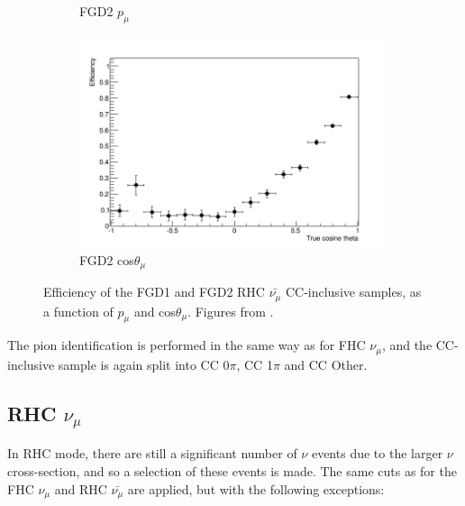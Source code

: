 \begin{figure}
\begin{subfigure}{.49\textwidth}
  \caption{FGD2 $p_{\mu}$}
\end{subfigure}
\begin{subfigure}{.49\textwidth}
  \centering
  \includegraphics[width=1.0\linewidth]{figs/effcosfgd2numubar}
  \caption{FGD2 cos$\theta_{\mu}$}
\end{subfigure}
\caption{Efficiency of the FGD1 and FGD2 RHC $\bar{\nu_{\mu}}$ CC-inclusive samples, as a function of $p_{\mu}$ and cos$\theta_{\mu}$. Figures from \cite{tn224}.}
\label{fig:numubareff}
\end{figure}

The pion identification is performed in the same way as for FHC $\nu_{\mu}$, and the CC-inclusive sample is again split into CC 0$\pi$, CC 1$\pi$ and CC Other.

\subsection{RHC $\nu_{\mu}$}

In RHC mode, there are still a significant number of $\nu$ events due to the larger $\nu$ cross-section, and so a selection of these events is made. The same cuts as for the FHC $\nu_{\mu}$ and RHC $\bar{\nu_{\mu}}$ are applied, but with the following exceptions:

